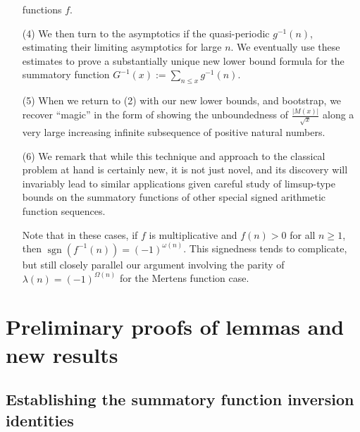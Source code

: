 \documentclass[11pt,reqno,a4letter]{article}
\numberwithin{figure}{section}
\numberwithin{table}{section}
\theoremstyle{plain}
\numberwithin{theorem}{section}
\theoremstyle{definition}
\begin{document}
\begin{itemize}
           functions $f$. 
\item[(4)] We then turn to the asymptotics if the quasi-periodic $g^{-1}(n)$, estimating their limiting asymptotics 
           for large $n$. We eventually use these estimates to prove a substantially unique new lower bound formula 
           for the summatory function $G^{-1}(x) := \sum_{n \leq x} g^{-1}(n)$. 
\item[(5)] When we return to (2) with our new lower bounds, and bootstrap, we recover ``magic'' in the form of 
           showing the unboundedness of $\frac{|M(x)|}{\sqrt{x}}$ along a very large increasing infinite subsequence 
           of positive natural numbers. 
\item[(6)] We remark that while this technique and approach to the classical problem at hand is certainly new, 
           it is not just novel, and its discovery will invariably lead to similar applications given careful 
           study of limsup-type bounds on the summatory functions of other special signed arithmetic function 
           sequences. 
           
           Note that in these cases, if $f$ is multiplicative and $f(n) > 0$ for all $n \geq 1$, then 
           $\operatorname{sgn}(f^{-1}(n)) = (-1)^{\omega(n)}$. This signedness tends to complicate, but still 
           closely parallel our argument involving the parity of $\lambda(n) = (-1)^{\Omega(n)}$ for the 
           Mertens function case. 
           
\end{itemize} 

\newpage 
\section{Preliminary proofs of lemmas and new results} 
\label{Section_PrelimProofs_Config} 

\subsection{Establishing the summatory function inversion identities} 
\end{document}
